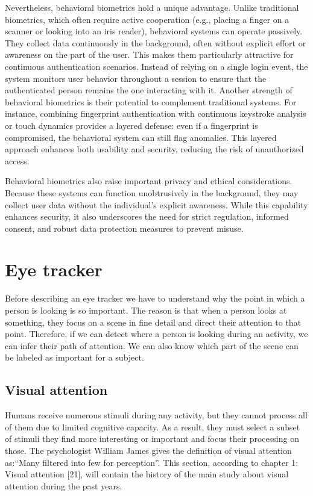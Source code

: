 \documentclass[12pt]{report}
\begin{document}
Nevertheless, behavioral biometrics hold a unique advantage. 
Unlike traditional biometrics, which often require active cooperation (e.g., placing a finger on a scanner or looking into an iris reader), behavioral systems can operate passively. 
They collect data continuously in the background, often without explicit effort or awareness on the part of the user. 
This makes them particularly attractive for continuous authentication scenarios. 
Instead of relying on a single login event, the system monitors user behavior throughout a session to ensure that the authenticated person remains the one interacting with it.
Another strength of behavioral biometrics is their potential to complement traditional systems. 
For instance, combining fingerprint authentication with continuous keystroke analysis or touch dynamics provides a layered defense: even if a fingerprint is compromised, the behavioral system can still flag anomalies. 
This layered approach enhances both usability and security, reducing the risk of unauthorized access.

Behavioral biometrics also raise important privacy and ethical considerations. 
Because these systems can function unobtrusively in the background, they may collect user data without the individual's explicit awareness. 
While this capability enhances security, it also underscores the need for strict regulation, informed consent, and robust data protection measures to prevent misuse.

\newpage

\chapter{Eye tracker}

Before describing an eye tracker we have to understand why the point in which a person is looking is so important.
The reason is that when a person looks at something, they focus on a scene in fine detail and direct their attention to that point.
Therefore, if we can detect where a person is looking during an activity, we can infer their path of attention.
We can also know which part of the scene can be labeled as important for a subject.

\section{Visual attention}
Humans receive numerous stimuli during any activity, but they cannot process all of them due to limited cognitive capacity.
As a result, they must select a subset of stimuli they find more interesting or important and focus their processing on those.
The psychologist William James gives the definition of visual attention as:“Many filtered into few for perception”.
This section, according to chapter 1: Visual attention [21], will contain the history of the main study about visual attention during the past years.
\end{document}
